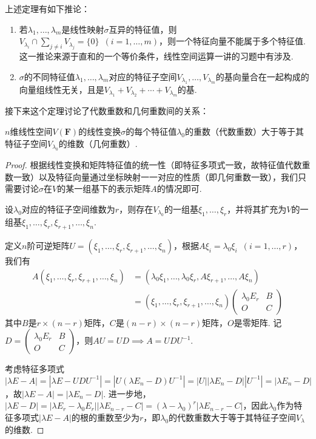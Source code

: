 上述定理有如下推论：
\begin{enumerate}
    \item 若$\lambda_1,\ldots,\lambda_m$是线性映射$\sigma$互异的特征值，则$V_{\lambda_i}\cap\sum\limits_{j\neq i}V_{\lambda_j}=\{0\}
              \enspace(i=1,\ldots,m)$，则一个特征向量不能属于多个特征值. 这一推论来源于直和的一个等价条件，线性空间运算一讲的习题中有涉及.

    \item $\sigma$的不同特征值$\lambda_1,\ldots,\lambda_m$对应的特征子空间$V_{\lambda_1},\ldots,V_{\lambda_m}$的基向量合在一起构成的向量组线性无关，且是$V_{\lambda_1}+V_{\lambda_2}+\cdots+V_{\lambda_m}$的基.
\end{enumerate}

接下来这个定理讨论了代数重数和几何重数间的关系：
\begin{theorem}\label{thm:18:代数重数与几何重数}
    $n$维线性空间$V(\mathbf{F})$的线性变换$\sigma$的每个特征值$\lambda_0$的重数（代数重数）大于等于其特征子空间$V_{\lambda_0}$的维数（几何重数）.
\end{theorem}

\begin{proof}
    根据线性变换和矩阵特征值的统一性（即特征多项式一致，故特征值代数重数一致）以及特征向量通过坐标映射一一对应的性质（即几何重数一致），我们只需要讨论$\sigma$在$V$的某一组基下的表示矩阵$A$的情况即可.

    设$\lambda_0$对应的特征子空间维数为$r$，则存在$V_{\lambda_0}$的一组基$\xi_1,\ldots,\xi_r$，并将其扩充为$V$的一组基$\xi_1,\ldots,\xi_r,\xi_{r+1},\ldots,\xi_n$.

    定义$n$阶可逆矩阵$U=(\xi_1,\ldots,\xi_r,\xi_{r+1},\ldots,\xi_n)$，根据$A\xi_i=\lambda_0\xi_i\enspace(i=1,\ldots,r)$，我们有
    \begin{align*}
        A(\xi_1,\ldots,\xi_r,\xi_{r+1},\ldots,\xi_n) & = (\lambda_0\xi_1,\ldots,\lambda_0\xi_r,A\xi_{r+1},\ldots,A\xi_n) \\
                                                     & = (\xi_1,\ldots,\xi_r,\xi_{r+1},\ldots,\xi_n)
        \begin{pmatrix}
            \lambda_0 E_r & B \\ O & C
        \end{pmatrix}
    \end{align*}
    其中$B$是$r\times(n-r)$矩阵，$C$是$(n-r)\times(n-r)$矩阵，$O$是零矩阵. 记$D=\begin{pmatrix}
            \lambda_0 E_r & B \\ O & C
        \end{pmatrix}$，则$AU=UD\implies A=UDU^{-1}$.

    考虑特征多项式$|\lambda E-A|=|\lambda E-UDU^{-1}|=|U(\lambda E_n-D)U^{-1}|=|U||\lambda E_n-D||U^{-1}|=|\lambda E_n-D|$，故$|\lambda E-A|=|\lambda E_n-D|$. 进一步地，$|\lambda E-D|=|\lambda E_r-\lambda_0 E_r||\lambda E_{n-r}-C|=(\lambda-\lambda_0)^r|\lambda E_{n-r}-C|$，因此$\lambda_0$作为特征多项式$|\lambda E-A|$的根的重数至少为$r$，即$\lambda_0$的代数重数大于等于其特征子空间$V_{\lambda}$的维数.
\end{proof}

